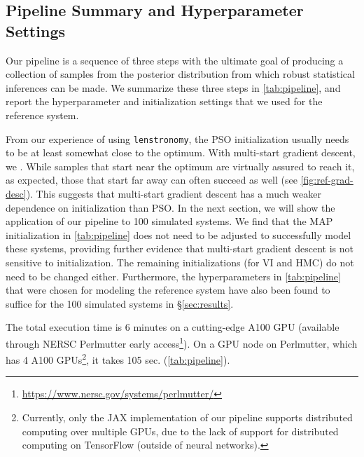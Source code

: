 \subsection{Pipeline Summary and Hyperparameter Settings}\label{sec:pipeline-sum}
Our pipeline is a sequence of three steps
with the ultimate goal of producing a collection of samples from the posterior distribution from which robust statistical inferences can be made. 
We summarize these three steps in \cref{tab:pipeline}, and report the hyperparameter and initialization settings that we used for the reference system.

From our experience of using \texttt{lenstronomy}, the PSO initialization usually needs to be at least somewhat close to the optimum. With multi-start gradient descent, we . While samples that start near the optimum are virtually assured to reach it, as expected, those that start far away can often succeed as well (see \cref{fig:ref-grad-desc}). This suggests that multi-start gradient descent has a much weaker dependence on initialization than PSO. In the next section, we will show the application of our pipeline to 100 simulated systems. We find that the MAP initialization in \cref{tab:pipeline} does not need to be adjusted to successfully model these systems, providing further evidence that multi-start gradient descent is not sensitive to initialization. The remaining initializations (for VI and HMC) do not need to be changed either. Furthermore, the hyperparameters in \cref{tab:pipeline} that were chosen for modeling the reference system have also been found to suffice for the 100 simulated systems in \S\ref{sec:results}.


The total execution time  is 6 minutes on a cutting-edge A100 GPU (available through NERSC Perlmutter early access\footnote{\url{https://www.nersc.gov/systems/perlmutter/}}). On a GPU node on Perlmutter, which has 4 A100 GPUs\footnote{Currently, only the JAX implementation of our pipeline supports distributed computing over multiple GPUs, due to the lack of support for distributed computing on TensorFlow (outside of neural networks).}, it takes 105 sec.  (\cref{tab:pipeline}).

